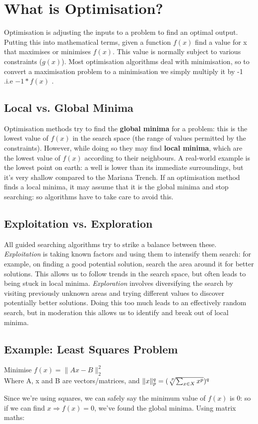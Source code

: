 \section{What is Optimisation?}
Optimisation is adjusting the inputs to a problem to find an optimal output. Putting this into mathematical terms, given a function $f(x)$ find a value for x that maximises or minimises $f(x)$. This value is normally subject to various constraints ($g(x)$). Most optimisation algorithms deal with minimisation, so to convert a maximisation problem to a minimisation we simply multiply it by -1 .i.e $-1*f(x)$ . 

\subsection {Local vs. Global Minima}
Optimisation methods try to find the \textbf{global minima} for a problem: this is the lowest value of $f(x)$ in the search space (the range of values permitted by the constraints). However, while doing so they may find \textbf{local minima}, which are the lowest value of $f(x)$ according to their neighbours. A real-world example is the lowest point on earth: a well is lower than its immediate surroundings, but it's very shallow compared to the Mariana Trench. If an optimisation method finds a local minima, it may assume that it is the global minima and stop searching: so algorithms have to take care to avoid this.

\subsection{Exploitation vs. Exploration}
All guided searching algorithms try to strike a balance between these.\\
\emph{Exploitation} is taking known factors and using them to intensify them search: for example, on finding a good potential solution, search the area around it for better solutions. This allows us to follow trends in the search space, but often leads to being stuck in local minima.
\emph{Exploration} involves diversifying the search by visiting previously unknown areas and trying different values to discover potentially better solutions. Doing this too much leads to an effectively random search, but in moderation this allows us to identify and break out of local minima.

\subsection{Example: Least Squares Problem}
\begin{center}
    Minimise \(f(x) = \| Ax-B \|_2^2  \) \\
    Where A, x and B are vectors/matrices, and $\|x\|_p^q = (\sqrt[\leftroot{-3}\uproot{3}p]{\sum_{x \in X}x^p})^q$
\end{center}
Since we're using squares, we can safely say the minimum value of $f(x)$ is 0: so if we can find $x \Rightarrow f(x)=0$, we've found the global minima. Using matrix maths:

